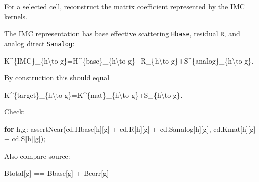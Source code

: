 \documentclass[
]{article}
\newenvironment{Shaded}{}{}
\newcommand{\ControlFlowTok}[1]{\textcolor[rgb]{0.00,0.44,0.13}{\textbf{#1}}}
\newcommand{\NormalTok}[1]{#1}
\newcommand{\OperatorTok}[1]{\textcolor[rgb]{0.40,0.40,0.40}{#1}}
\begin{document}
For a selected cell, reconstruct the matrix coefficient represented by
the IMC kernels.

The IMC representation has base effective scattering \texttt{Hbase},
residual \texttt{R}, and analog direct \texttt{Sanalog}:

\begin{Shaded}
\begin{Highlighting}[]
\NormalTok{K\^{}\{IMC\}\_\{h\textbackslash{}to g\}=H\^{}\{base\}\_\{h\textbackslash{}to g\}+R\_\{h\textbackslash{}to g\}+S\^{}\{analog\}\_\{h\textbackslash{}to g\}.}
\end{Highlighting}
\end{Shaded}

By construction this should equal

\begin{Shaded}
\begin{Highlighting}[]
\NormalTok{K\^{}\{target\}\_\{h\textbackslash{}to g\}=K\^{}\{mat\}\_\{h\textbackslash{}to g\}+S\_\{h\textbackslash{}to g\}.}
\end{Highlighting}
\end{Shaded}

Check:

\begin{Shaded}
\begin{Highlighting}[]
\ControlFlowTok{for}\NormalTok{ h}\OperatorTok{,}\NormalTok{g}\OperatorTok{:}
\NormalTok{    assertNear}\OperatorTok{(}\NormalTok{cd}\OperatorTok{.}\NormalTok{Hbase}\OperatorTok{[}\NormalTok{h}\OperatorTok{][}\NormalTok{g}\OperatorTok{]} \OperatorTok{+}\NormalTok{ cd}\OperatorTok{.}\NormalTok{R}\OperatorTok{[}\NormalTok{h}\OperatorTok{][}\NormalTok{g}\OperatorTok{]} \OperatorTok{+}\NormalTok{ cd}\OperatorTok{.}\NormalTok{Sanalog}\OperatorTok{[}\NormalTok{h}\OperatorTok{][}\NormalTok{g}\OperatorTok{],}
\NormalTok{               cd}\OperatorTok{.}\NormalTok{Kmat}\OperatorTok{[}\NormalTok{h}\OperatorTok{][}\NormalTok{g}\OperatorTok{]} \OperatorTok{+}\NormalTok{ cd}\OperatorTok{.}\NormalTok{S}\OperatorTok{[}\NormalTok{h}\OperatorTok{][}\NormalTok{g}\OperatorTok{]);}
\end{Highlighting}
\end{Shaded}

Also compare source:

\begin{Shaded}
\begin{Highlighting}[]
\NormalTok{Btotal}\OperatorTok{[}\NormalTok{g}\OperatorTok{]} \OperatorTok{==}\NormalTok{ Bbase}\OperatorTok{[}\NormalTok{g}\OperatorTok{]} \OperatorTok{+}\NormalTok{ Bcorr}\OperatorTok{[}\NormalTok{g}\OperatorTok{]}
\end{Highlighting}
\end{Shaded}
\end{document}
